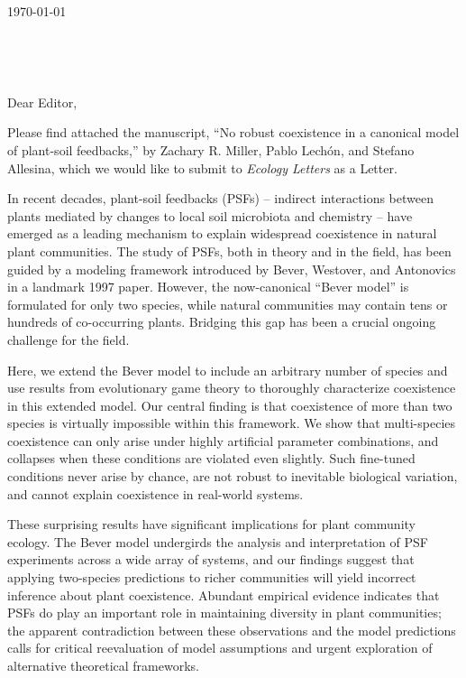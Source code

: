 \documentclass[11pt]{letter}
\renewcommand{\opening}[1]{
	{\centering\noindent\fromaddress\vspace{0.05\textheight} \\ %
	\hspace*{\longindentation}
	\hspace*{\fill}\par} %
	{\raggedright \toname \\ \toaddress \par} %
	\vspace{0.5cm} %
	\noindent #1 %
}
\begin{document}

\begin{letter}{

	\today
}


\opening{Dear Editor,}

\frenchspacing

Please find attached the manuscript, ``No robust coexistence in a canonical model of plant-soil feedbacks,'' by Zachary R.
Miller, Pablo Lech\'{o}n, and Stefano Allesina, which we would like to submit to \textit{Ecology Letters} as a Letter.

In recent decades, plant-soil feedbacks (PSFs) -- indirect interactions between plants mediated by changes to local soil microbiota and chemistry -- have emerged as a leading mechanism to explain widespread coexistence in natural plant communities. The study of PSFs, both in theory and in the field, has been guided by a modeling framework introduced by Bever, Westover, and Antonovics in a landmark 1997 paper. However, the now-canonical ``Bever model'' is formulated for only two species, while natural communities may contain tens or hundreds of co-occurring plants. Bridging this gap has been a crucial ongoing challenge for the field.

Here, we extend the Bever model to include an arbitrary number of species and use results from evolutionary game theory to thoroughly characterize coexistence in this extended model. Our central finding is that coexistence of more than two species is virtually impossible within this framework. We show that multi-species coexistence can only arise under highly artificial parameter combinations, and collapses when these conditions are violated even slightly. Such fine-tuned conditions never arise by chance, are not robust to inevitable biological variation, and cannot explain coexistence in real-world systems.

These surprising results have significant implications for plant community ecology. The Bever model undergirds the analysis and interpretation of PSF experiments across a wide array of systems, and our findings suggest that applying two-species predictions to richer communities will yield incorrect inference about plant coexistence. Abundant empirical evidence indicates that PSFs do play an important role in maintaining diversity in plant communities; the apparent contradiction between these observations and the model predictions calls for critical reevaluation of model assumptions and urgent exploration of alternative theoretical frameworks.


\end{letter}
\end{document}
